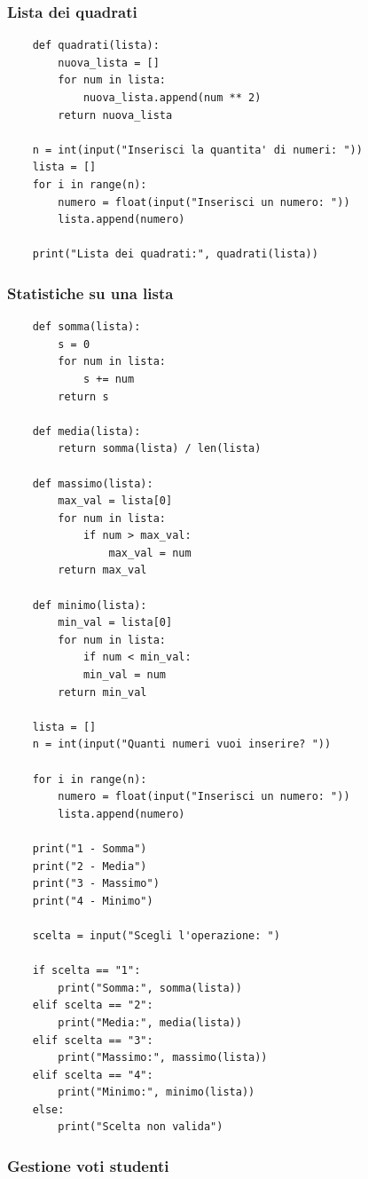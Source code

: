 \documentclass[a4paper,12pt]{article}
\begin{document}
\newpage
\subsubsection{Lista dei quadrati}

\begin{lstlisting}
	def quadrati(lista):
		nuova_lista = []
		for num in lista:
			nuova_lista.append(num ** 2)
		return nuova_lista
	
	n = int(input("Inserisci la quantita' di numeri: "))
	lista = []
	for i in range(n):
		numero = float(input("Inserisci un numero: "))
		lista.append(numero)
	
	print("Lista dei quadrati:", quadrati(lista))
\end{lstlisting}

\newpage
\subsubsection{Statistiche su una lista}

\begin{lstlisting}
	def somma(lista):
		s = 0
		for num in lista:
			s += num
		return s
	
	def media(lista):
		return somma(lista) / len(lista)
	
	def massimo(lista):
		max_val = lista[0]
		for num in lista:
			if num > max_val:
				max_val = num
		return max_val
	
	def minimo(lista):
		min_val = lista[0]
		for num in lista:
			if num < min_val:
			min_val = num
		return min_val
	
	lista = []
	n = int(input("Quanti numeri vuoi inserire? "))
	
	for i in range(n):
		numero = float(input("Inserisci un numero: "))
		lista.append(numero)
	
	print("1 - Somma")
	print("2 - Media")
	print("3 - Massimo")
	print("4 - Minimo")
	
	scelta = input("Scegli l'operazione: ")
	
	if scelta == "1":
		print("Somma:", somma(lista))
	elif scelta == "2":
		print("Media:", media(lista))
	elif scelta == "3":
		print("Massimo:", massimo(lista))
	elif scelta == "4":
		print("Minimo:", minimo(lista))
	else:
		print("Scelta non valida")
\end{lstlisting}

\newpage
\subsubsection{Gestione voti studenti}
\end{document}
